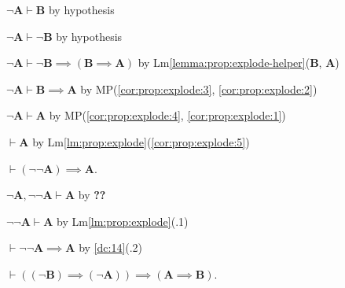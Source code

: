 \documentclass{amsart}%
\newcommand\metavariable[1]{\boldsymbol{#1}}
\begin{document}
\begin{pf} 
\item\label{cor:prop:explode:1} $\neg\metavariable{A}\vdash\metavariable{B}$
  by hypothesis
\item\label{cor:prop:explode:2} $\neg\metavariable{A}\vdash\neg\metavariable{B}$
  by hypothesis
\item\label{cor:prop:explode:3} $\neg\metavariable{A}\vdash\neg\metavariable{B}\implies(\metavariable{B}\implies\metavariable{A})$
  by Lm\ref{lemma:prop:explode-helper}($\metavariable{B}$, $\metavariable{A}$)
\item\label{cor:prop:explode:4} $\neg\metavariable{A}\vdash\metavariable{B}\implies\metavariable{A}$
  by MP(\ref{cor:prop:explode:3}, \ref{cor:prop:explode:2})
\item\label{cor:prop:explode:5} $\neg\metavariable{A}\vdash\metavariable{A}$
  by MP(\ref{cor:prop:explode:4}, \ref{cor:prop:explode:1})
\item\label{cor:prop:explode:6} $\vdash\metavariable{A}$ by Lm\ref{lm:prop:explode}(\ref{cor:prop:explode:5})
\end{pf}

\begin{dc}\label{dc:16}
$\vdash(\neg\neg\metavariable{A})\implies\metavariable{A}$.
\end{dc}

\begin{pf}
\item $\neg\metavariable{A},\neg\neg\metavariable{A}\vdash\metavariable{A}$
  by \textbf{??}
\item $\neg\neg\metavariable{A}\vdash\metavariable{A}$ by Lm\ref{lm:prop:explode}(.1)
\item $\vdash\neg\neg\metavariable{A}\implies\metavariable{A}$ by \ref{dc:14}(.2)
\end{pf}

\begin{dc}\label{dc:17}
$\vdash((\neg\metavariable{B})\implies(\neg\metavariable{A}))\implies(\metavariable{A}\implies\metavariable{B})$.
\end{dc}
\end{document}
